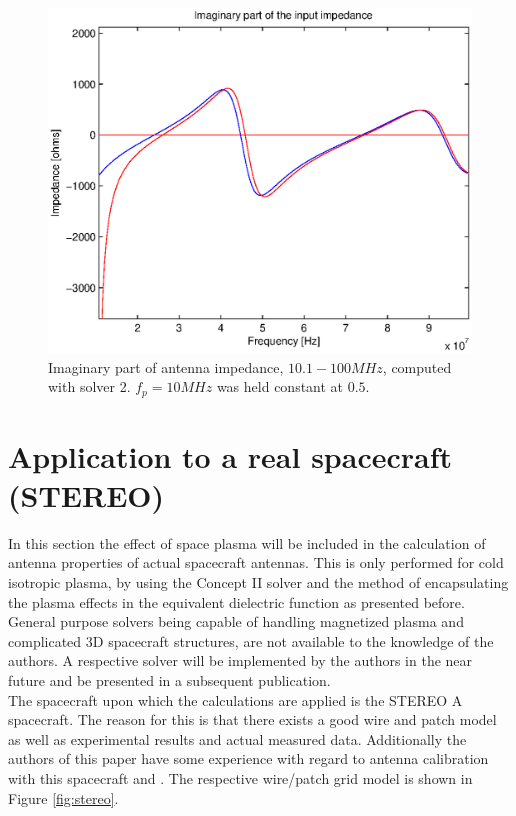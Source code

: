 \documentclass[a4paper,11pt]{article}
\begin{document}
\begin{figure}
\includegraphics[width=12cm]{imps_dipole_solver2_imag2.eps}
\caption{Imaginary part of antenna impedance, $10.1 - 100 MHz$, computed with solver 2. $f_p=10MHz$ was held constant at $0.5$.}
\label{fig:impedances_dipole_solver2_imag2}
\end{figure}

\section{Application to a real spacecraft (STEREO)}
In this section the effect of space plasma will be included in the calculation of antenna properties of actual spacecraft antennas. This is only performed for cold isotropic plasma, by using the Concept II solver and the method of encapsulating the plasma effects in the equivalent dielectric function as presented before. General purpose solvers being capable of handling magnetized plasma and complicated 3D spacecraft structures, are not available to the knowledge of the authors. A respective solver will be implemented by the authors in the near future and be presented in a subsequent publication. \\

The spacecraft upon which the calculations are applied is the STEREO A spacecraft. The reason for this is that there exists a good wire and patch model as well as experimental results and actual measured data. Additionally the authors of this paper have some experience with regard to antenna calibration with this spacecraft \cite{ossi09} and \cite{panchenko10}. The respective wire/patch grid model is shown in Figure \ref{fig:stereo}.\\
\end{document}
